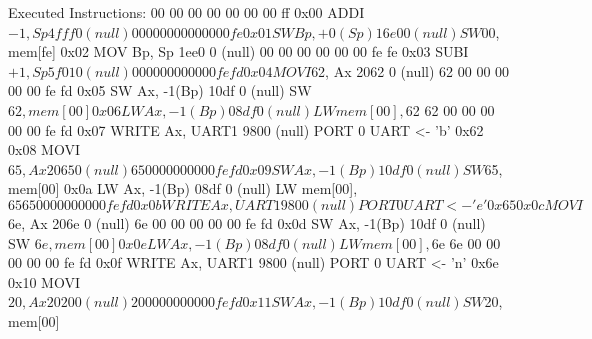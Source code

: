 Executed Instructions:
                                                  00 00 00 00 00 00 00 ff
0x00 ADDI  $-1,  Sp      4fff          0  (null)
                                                  00 00 00 00 00 00 00 fe
0x01   SW  Bp,   +0(Sp)  16e0          0  (null)
                                                  SW $00, mem[fe]
0x02 MOV   Bp,   Sp      1ee0          0  (null)
                                                  00 00 00 00 00 00 fe fe
0x03 SUBI  $+1,  Sp      5f01          0  (null)
                                                  00 00 00 00 00 00 fe fd
0x04 MOVI  $62,  Ax      2062          0  (null)
                                                  62 00 00 00 00 00 fe fd
0x05   SW  Ax,   -1(Bp)  10df          0  (null)
                                                  SW $62, mem[00]
0x06   LW  Ax,   -1(Bp)  08df          0  (null)
                                                  LW mem[00], $62
                                                  62 00 00 00 00 00 fe fd
0x07 WRITE Ax,   UART1   9800  (null)     
                                                  PORT 0
                                                  UART <- 'b' 0x62
0x08 MOVI  $65,  Ax      2065          0  (null)
                                                  65 00 00 00 00 00 fe fd
0x09   SW  Ax,   -1(Bp)  10df          0  (null)
                                                  SW $65, mem[00]
0x0a   LW  Ax,   -1(Bp)  08df          0  (null)
                                                  LW mem[00], $65
                                                  65 00 00 00 00 00 fe fd
0x0b WRITE Ax,   UART1   9800  (null)     
                                                  PORT 0
                                                  UART <- 'e' 0x65
0x0c MOVI  $6e,  Ax      206e          0  (null)
                                                  6e 00 00 00 00 00 fe fd
0x0d   SW  Ax,   -1(Bp)  10df          0  (null)
                                                  SW $6e, mem[00]
0x0e   LW  Ax,   -1(Bp)  08df          0  (null)
                                                  LW mem[00], $6e
                                                  6e 00 00 00 00 00 fe fd
0x0f WRITE Ax,   UART1   9800  (null)     
                                                  PORT 0
                                                  UART <- 'n' 0x6e
0x10 MOVI  $20,  Ax      2020          0  (null)
                                                  20 00 00 00 00 00 fe fd
0x11   SW  Ax,   -1(Bp)  10df          0  (null)
                                                  SW $20, mem[00]
